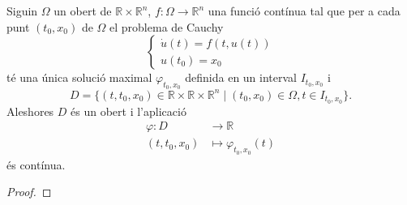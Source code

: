 \documentclass[../../Main.tex]{subfiles}
\begin{document}
	\begin{theorem}
		\label{thm:continuitat respecte les condicions inicials}
		Siguin \(\Omega\) un obert de \(\mathbb{R}\times\mathbb{R}^{n}\), \(f\colon\Omega\longrightarrow\mathbb{R}^{n}\) una funció contínua tal que per a cada punt \((t_{0},x_{0})\) de \(\Omega\) el problema de Cauchy
		\[\begin{cases}
			\dot{u}(t)=f(t,u(t)) \\
			u(t_{0})=x_{0}
		\end{cases}\]
		té una única solució maximal \(\varphi_{t_{0},x_{0}}\) definida en un interval \(I_{t_{0},x_{0}}\) i
		\[
		    D=\{(t,t_{0},x_{0})\in\mathbb{R}\times\mathbb{R}\times\mathbb{R}^{n}\mid(t_{0},x_{0})\in\Omega,t\in I_{t_{0},x_{0}}\}.
		\]
		Aleshores \(D\) és un obert i l'aplicació
		\begin{align*}
			\varphi\colon D&\longrightarrow\mathbb{R} \\
			(t,t_{0},x_{0})&\longmapsto\varphi_{t_{0},x_{0}}(t)
		\end{align*}
		és contínua.
		\begin{proof}
		\end{proof}
	\end{theorem}
	
	
	
	
	
	
	
\end{document}
